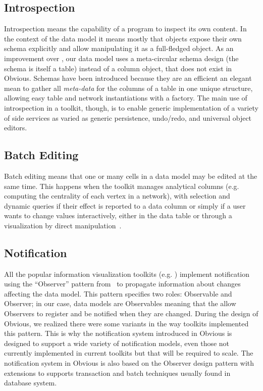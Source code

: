 \subsection{Introspection}

Introspection means the capability of a program to inspect its own
content. In the context of the data model it means mostly that objects
expose their own schema explicitly and allow manipulating it as a
full-fledged object.  As an improvement over \cite{DesignPatternsIV},
our data model uses a meta-circular schema design (the schema is
itself a table) instead of a column object, that does not exist in
Obvious.  Schemas have been introduced because they are an efficient
an elegant mean to gather all \emph{meta-data} for the columns of a
table in one unique structure, allowing easy table and network
instantiations with a factory.  The main use of introspection in a
toolkit, though, is to enable generic implementation of a variety of
side services as varied as generic persistence, undo/redo, and
universal object editors.

\subsection{Batch Editing}

Batch editing means that one or many cells in a data model may be
edited at the same time.  This happens when the toolkit manages
analytical columns (e.g. computing the centrality of each vertex in a
network), with selection and dynamic queries if their effect is
reported to a data column or simply if a user wants to change values
interactively, either in the data table or through a visualization by
direct manipulation~\cite{Discovery3}.

\subsection{Notification}

All the popular information visualization toolkits
(e.g. \cite{Prefuse, InfoVis, jung2003, Discovery1}) implement
notification using the ``Observer'' pattern from~\cite{DesignPatterns}
to propagate information about changes affecting the data model.  This
pattern specifies two roles: Observable and Observer; in our case,
data models are Observables meaning that the allow Observers to
register and be notified when they are changed.  During the design of
Obvious, we realized there were some variants in the way toolkits
implemented this pattern.  This is why the notification system
introduced in Obvious is designed to support a wide variety of
notification models, even those not currently implemented in current
toolkits but that will be required to scale.  The notification system
in Obvious is also based on the Observer design pattern with
extensions to supports transaction and batch techniques usually found
in database system.

